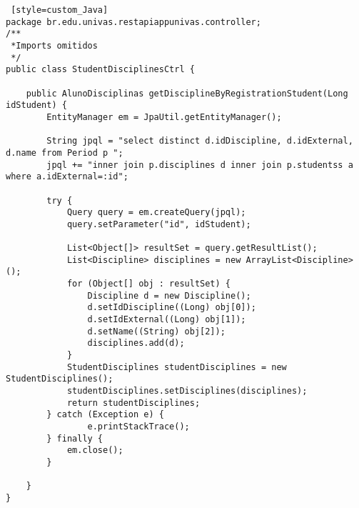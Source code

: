 \begin{lstlisting} [style=custom_Java]
package br.edu.univas.restapiappunivas.controller;
/**
 *Imports omitidos
 */
public class StudentDisciplinesCtrl {
	
	public AlunoDisciplinas getDisciplineByRegistrationStudent(Long idStudent) {
		EntityManager em = JpaUtil.getEntityManager();

		String jpql = "select distinct d.idDiscipline, d.idExternal, d.name from Period p "; 
		jpql += "inner join p.disciplines d inner join p.studentss a where a.idExternal=:id";

		try {
			Query query = em.createQuery(jpql);
			query.setParameter("id", idStudent);

			List<Object[]> resultSet = query.getResultList();
			List<Discipline> disciplines = new ArrayList<Discipline>();
			for (Object[] obj : resultSet) {
				Discipline d = new Discipline();
				d.setIdDiscipline((Long) obj[0]);
				d.setIdExternal((Long) obj[1]);
				d.setName((String) obj[2]);
				disciplines.add(d);
			}
			StudentDisciplines studentDisciplines = new StudentDisciplines();
			studentDisciplines.setDisciplines(disciplines);
			return studentDisciplines;
		} catch (Exception e) {
				e.printStackTrace();
		} finally {
			em.close();
		}

	}
}


\end{lstlisting}
